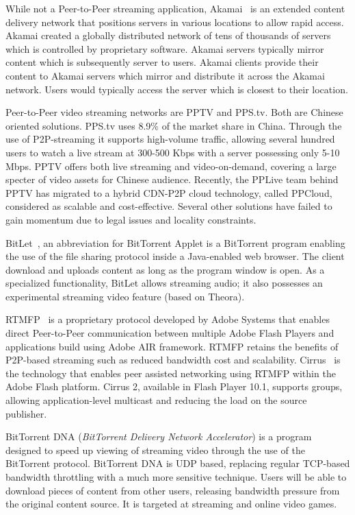 While not a Peer-to-Peer streaming application, Akamai~\cite{akamai} is an
extended content delivery network that positions servers in various locations
to allow rapid access. Akamai created a globally distributed network of
tens of thousands of servers which is controlled by proprietary software.
Akamai servers typically mirror content which is subsequently server to users.
Akamai clients provide their content to Akamai servers which mirror and
distribute it across the Akamai network. Users would typically access the
server which is closest to their location.

Peer-to-Peer video streaming networks are PPTV and PPS.tv. Both are Chinese
oriented solutions. PPS.tv uses 8.9\% of the market share in China. Through
the use of P2P-streaming it supports high-volume traffic, allowing several
hundred users to watch a live stream at 300-500 Kbps with a server possessing
only 5-10 Mbps. PPTV offers both live streaming and video-on-demand, covering
a large specter of video assets for Chinese audience. Recently, the PPLive
team behind PPTV has migrated to a hybrid CDN-P2P cloud technology, called
PPCloud, considered as scalable and cost-effective. Several other solutions
have failed to gain momentum due to legal issues and locality constraints.

BitLet~\cite{bitlet}, an abbreviation for BitTorrent Applet is a BitTorrent
program enabling the use of the file sharing protocol inside a Java-enabled
web browser. The client download and uploads content as long as the program
window is open. As a specialized functionality, BitLet allows streaming audio;
it also possesses an experimental streaming video feature (based on Theora).

RTMFP~\cite{rtmfp} is a proprietary protocol developed by Adobe Systems that
enables direct Peer-to-Peer communication between multiple Adobe Flash Players
and applications build using Adobe AIR framework. RTMFP retains the benefits
of P2P-based streaming such as reduced bandwidth cost and scalability.
Cirrus~\cite{cirrus} is the technology that enables peer assisted networking
using RTMFP within the Adobe Flash platform. Cirrus 2, available in Flash
Player 10.1, supports groups, allowing application-level multicast and
reducing the load on the source publisher.

BitTorrent DNA (\textit{BitTorrent Delivery Network Accelerator}) is a program
designed to speed up viewing of streaming video through the use of the
BitTorrent protocol. BitTorrent DNA is UDP based, replacing regular TCP-based
bandwidth throttling with a much more sensitive technique. Users will be able
to download pieces of content from other users, releasing bandwidth pressure
from the original content source. It is targeted at streaming and online video
games.

